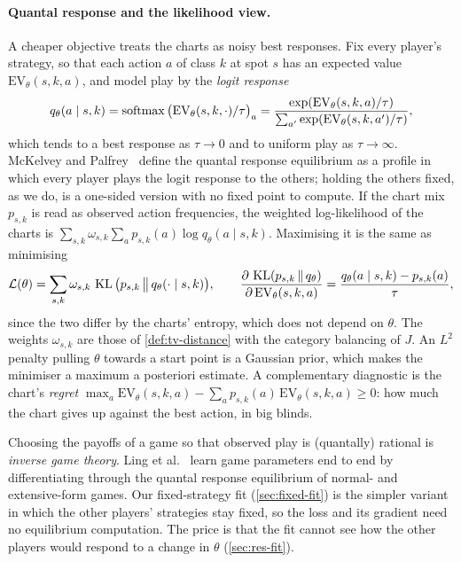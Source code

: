 \paragraph{Quantal response and the likelihood view.}
A cheaper objective treats the charts as noisy best responses. Fix every player's strategy, so that each action $a$
of class $k$ at spot $s$ has an expected value $\mathrm{EV}_\theta(s,k,a)$, and model play by the \emph{logit
response}
\[
  q_\theta(a \mid s,k) = \operatorname{softmax}\big(\mathrm{EV}_\theta(s,k,\cdot)/\tau\big)_a
  = \frac{\exp(\mathrm{EV}_\theta(s,k,a)/\tau)}{\sum_{a'} \exp(\mathrm{EV}_\theta(s,k,a')/\tau)},
\]
which tends to a best response as $\tau \to 0$ and to uniform play as $\tau \to \infty$. McKelvey and
Palfrey~\cite{mckelvey1995} define the quantal response equilibrium as a profile in which every player plays the logit
response to the others; holding the others fixed, as we do, is a one-sided version with no fixed point to compute. If
the chart mix $p_{s,k}$ is read as observed action frequencies, the weighted log-likelihood of the charts is
$\sum_{s,k} \omega_{s,k} \sum_a p_{s,k}(a) \log q_\theta(a\mid s,k)$. Maximising it is the same as minimising
\[
  \mathcal L(\theta) = \sum_{s,k} \omega_{s,k}\, \operatorname{KL}\big(p_{s,k} \,\big\|\, q_\theta(\cdot\mid s,k)\big), \qquad
  \frac{\partial\, \operatorname{KL}(p_{s,k}\,\|\,q_\theta)}{\partial\, \mathrm{EV}_\theta(s,k,a)} = \frac{q_\theta(a\mid s,k) - p_{s,k}(a)}{\tau},
\]
since the two differ by the charts' entropy, which does not depend on $\theta$. The weights $\omega_{s,k}$ are those
of \cref{def:tv-distance} with the category balancing of $J$. An $L^2$ penalty pulling $\theta$ towards a start point is
a Gaussian prior, which makes the minimiser a maximum a posteriori estimate. A complementary diagnostic is the chart's
\emph{regret} $\max_a \mathrm{EV}_\theta(s,k,a) - \sum_a p_{s,k}(a)\,\mathrm{EV}_\theta(s,k,a) \ge 0$: how much the
chart gives up against the best action, in big blinds.

Choosing the payoffs of a game so that observed play is (quantally) rational is \emph{inverse game theory}. Ling et
al.~\cite{ling2018} learn game parameters end to end by differentiating through the quantal response equilibrium of
normal- and extensive-form games. Our fixed-strategy fit (\cref{sec:fixed-fit}) is the simpler variant in which the
other players' strategies stay fixed, so the loss and its gradient need no equilibrium computation. The price is that
the fit cannot see how the other players would respond to a change in $\theta$ (\cref{sec:res-fit}).
